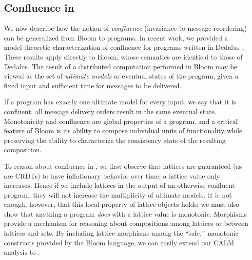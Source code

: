 \subsection{Confluence in \lang}
\label{sec:calmL}

We now describe how the notion of \emph{confluence} (invariance to message
reordering) can be generalized from Bloom to \lang programs.  In recent work, we
provided a model-theoretic characterization of confluence for programs written
in Dedalus~\cite{dedalus-pods12-tr}.  These results apply directly to Bloom,
whose semantics are identical to those of Dedalus.  The result of a distributed
computation performed in Bloom may be viewed as the set of \emph{ultimate
  models} or eventual states of the program, given a fixed input and sufficient
time for messages to be delivered.

If a program has exactly one ultimate model for every input, we say that it is
confluent: all message delivery orders result in the same eventual state.
Monotonicity and confluence are global properties of a program, and a critical
feature of Bloom is its ability to compose individual units of functionality
while preserving the ability to characterize the consistency state of the
resulting composition.

To reason about confluence in \lang, we first observe that lattices are
guaranteed (as are CRDTs) to have inflationary behavior over time: a lattice
value only increases.  Hence if we include lattices in the output of an
otherwise confluent \lang program, they will not increase the multiplicity of
ultimate models.  It is not enough, however, that this local property of lattice
objects holds: we must also show that anything a \lang program \emph{does} with
a lattice value is monotonic.  Morphisms provide a mechanism for reasoning about
compositions among lattices or between lattices and sets.  By including lattice
morphisms among the ``safe,'' monotonic constructs provided by the Bloom
language, we can easily extend our CALM analysis to \lang.
